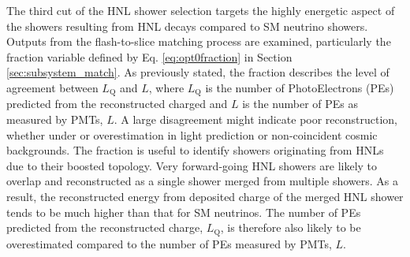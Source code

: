 The third cut of the HNL shower selection targets the highly energetic aspect of the showers resulting from HNL decays compared to SM neutrino showers.
Outputs from the flash-to-slice matching process are examined, particularly the fraction variable defined by Eq. \ref{eq:opt0fraction} in Section \ref{sec:subsystem_match}.
As previously stated, the fraction describes the level of agreement between $L_{\mathrm{Q}}$ and $L$, where $L_\mathrm{Q}$ is the number of PhotoElectrons (PEs) predicted from the reconstructed charged and $L$ is the number of PEs as measured by PMTs, $L$.
A large disagreement might indicate poor reconstruction, whether under or overestimation in light prediction or non-coincident cosmic backgrounds.
The fraction is useful to identify showers originating from HNLs due to their boosted topology.
Very forward-going HNL showers are likely to overlap and reconstructed as a single shower merged from multiple showers.   
As a result, the reconstructed energy from deposited charge of the merged HNL shower tends to be much higher than that for SM neutrinos.
The number of PEs predicted from the reconstructed charge, $L_{\mathrm{Q}}$, is therefore also likely to be overestimated compared to the number of PEs measured by PMTs, $L$.

